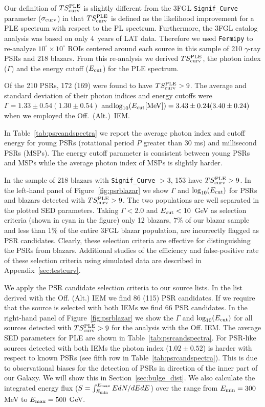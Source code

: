 \documentclass[iop]{emulateapj}
\newcommand{\fermipy}{\texttt{Fermipy}\xspace}
\begin{document}
Our definition of $TS^{\rm{PLE}}_{\rm{curv}}$ is slightly different
from the 3FGL \texttt{Signif\_Curve} parameter ($\sigma_{\rm{curv}}$)
in that $TS^{\rm{PLE}}_{\rm{curv}}$ is defined as the likelihood
improvement for a PLE spectrum with respect to the PL spectrum.
Furthermore, the 3FGL catalog analysis was based on only 4~years of
LAT data.  Therefore we used \fermipy to re-analyze
$10^{\circ}\times10^{\circ}$ ROIs centered around each source in this
sample of 210 $\gamma$-ray PSRs and 218 blazars.  From this
re-analysis we derived $TS^{\rm{PLE}}_{\rm{curv}}$, the photon index
($\Gamma$) and the energy cutoff ($E_{\rm{cut}}$) for the PLE
spectrum.  

Of the 210 PSRs, 172 (169) were found to have
$TS^{\rm{PLE}}_{\rm{curv}}>9$.  The average and standard deviation of
their photon indices and energy cutoffs were
$\Gamma=1.33\pm0.54 (1.30\pm0.54)$
and$\log_{10}(E_{\rm{cut}}[\rm{MeV}])=3.43\pm0.24 (3.40\pm0.24)$ when
we employed the Off.~(Alt.)~IEM.

In Table~\ref{tab:psrcandspectra} we
report the average photon index and cutoff energy for young PSRs
(rotational period $P$ greater than 30 ms) and millisecond PSRs
(MSPs). The energy cutoff parameter is consistent between young PSRs
and MSPs while the average photon index of MSPs is slightly harder.

In the sample of 218 blazars with \texttt{Signif\_Curve} $> 3$, 153 have
$TS^{\rm{PLE}}_{\rm{curv}}>9$.  In the left-hand panel of
Figure~\ref{fig:psrblazar} we show $\Gamma$ and
$\log_{10}(E_{\rm{cut}})$ for PSRs and blazars detected with
$TS^{\rm{PLE}}_{\rm{curv}}>9$. The two populations are well separated
in the plotted SED parameters. Taking $\Gamma<2.0$ and
$E_{\rm{cut}} < 10$~GeV as selection criteria (shown
in cyan in the figure) only 12 blazars, $7\%$ of our blazar sample and
less than $1\%$ of the entire 3FGL blazar population, are incorrectly
flagged as PSR candidates.  Clearly, these selection criteria are
effective for distinguishing the PSRs from blazars.  Additional studies
of the efficiency and false-positive rate of these selection criteria
using simulated data are described in Appendix~\ref{sec:testcurv}.  

We apply the PSR candidate selection criteria to our source lists.  In
the list derived with the Off. (Alt.) IEM we find 86 (115) PSR
candidates.  If we require that the source is selected with both IEMs
we find 66 PSR candidates.  In the right-hand panel of
Figure~\ref{fig:psrblazar} we show the $\Gamma$ and
$\log_{10}(E_{\rm{cut}})$ for all sources detected with
$TS^{\rm{PLE}}_{\rm{curv}}>9$ for the analysis with the Off.  IEM.
The average SED parameters for PLE are shown in
Table~\ref{tab:psrcandspectra}.  For PSR-like sources detected with
both IEMs the photon index ($1.02\pm 0.52$) is harder with respect to
known PSRs (see fifth row in Table~\ref{tab:psrcandspectra}).  This is
due to observational biases for the detection of PSRs in direction of
the inner part of our Galaxy.  We will show this in
Section~\ref{sec:bulge_dist}.  We also calculate the integrated energy
flux ($S = \int^{E_{\rm{max}}}_{E_{\rm{min}}} E dN/dE dE$) over the
range from $E_{\rm{min}}=300$ MeV to $E_{\rm{max}}=500$ GeV.
\end{document}
